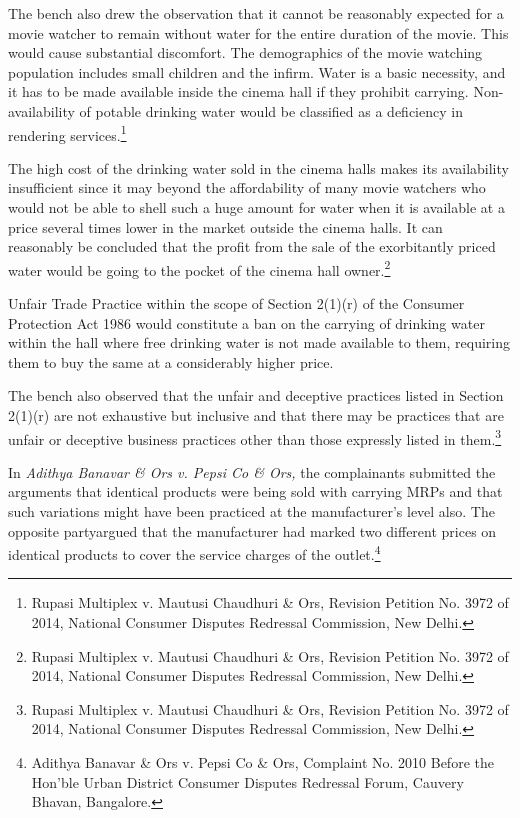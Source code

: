 \begin{multicols}{2}
\vspace{-.1cm}

\noi
The bench also drew the observation that it cannot be reasonably expected for a movie watcher
to remain without water for the entire duration of the movie. This would cause substantial
discomfort. The demographics of the movie watching population includes small children and
the infirm. Water is a basic necessity, and it has to be made available inside the cinema hall if
they prohibit carrying. Non-availability of potable drinking water would be classified as a
deficiency in rendering services.\footnote{Rupasi Multiplex v. Mautusi Chaudhuri \& Ors, Revision Petition No. 3972 of 2014, National Consumer Disputes Redressal Commission, New Delhi.}

\vspace{-.1cm}

\noi
The high cost of the drinking water sold in the cinema halls makes its availability insufficient
since it may beyond the affordability of many movie watchers who would not be able to shell
such a huge amount for water when it is available at a price several times lower in the market
outside the cinema halls. It can reasonably be concluded that the profit from the sale of the
exorbitantly priced water would be going to the pocket of the cinema hall owner.\footnote{Rupasi Multiplex v. Mautusi Chaudhuri \& Ors, Revision Petition No. 3972 of 2014, National Consumer Disputes Redressal Commission, New Delhi.}

\vspace{-.1cm}

\noi
Unfair Trade Practice within the scope of Section 2(1)(r) of the Consumer Protection Act 1986
would constitute a ban on the carrying of drinking water within the hall where free drinking
water is not made available to them, requiring them to buy the same at a considerably higher
price.

\noi
The bench also observed that the unfair and deceptive practices listed in Section 2(1)(r) are not
exhaustive but inclusive and that there may be practices that are unfair or deceptive business
practices other than those expressly listed in them.\footnote{Rupasi Multiplex v. Mautusi Chaudhuri \& Ors, Revision Petition No. 3972 of 2014, National Consumer Disputes Redressal Commission, New Delhi.}

\noi
In \textit{Adithya Banavar \& Ors v. Pepsi Co \& Ors,} the complainants submitted the arguments that
identical products were being sold with carrying MRPs and that such variations might have
been practiced at the manufacturer’s level also. The opposite partyargued that the manufacturer
had marked two different prices on identical products to cover the service charges of the
outlet.\footnote{Adithya Banavar \& Ors v. Pepsi Co \& Ors, Complaint No. 2010 Before the Hon’ble Urban District Consumer Disputes Redressal Forum, Cauvery Bhavan, Bangalore.}


\end{multicols}
